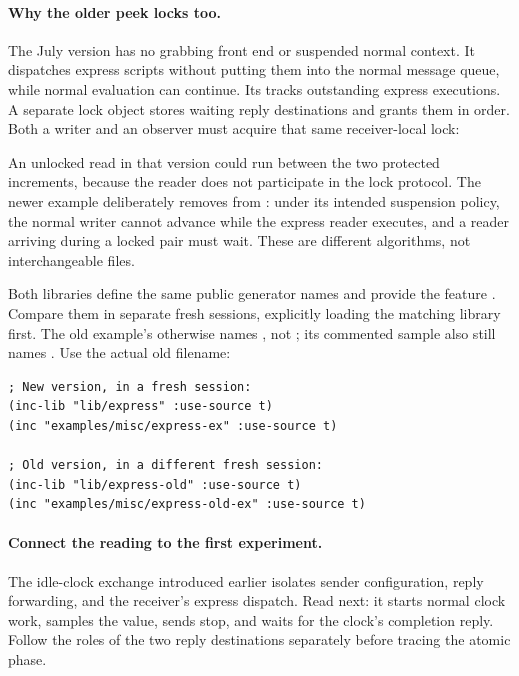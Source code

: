 \paragraph{Why the older peek locks too.}
The July version has no grabbing front end or suspended normal context.
It dispatches express scripts without putting them into the normal
message queue, while normal evaluation can continue. Its
 tracks outstanding express executions. A separate
lock object stores waiting reply destinations and grants them in order.
Both a writer and an observer must acquire that same receiver-local lock:


An unlocked read in that version could run between the two protected
increments, because the reader does not participate in the lock protocol.
The newer example deliberately removes  from :
under its intended suspension policy, the normal writer cannot advance
while the express reader executes, and a reader arriving during a locked
pair must wait. These are different algorithms, not interchangeable files.

Both libraries define the same public generator names and provide the
feature . Compare them in separate fresh sessions, explicitly
loading the matching library first. The old example's 
otherwise names , not ; its commented
sample also still names . Use the actual old filename:

\begin{codeblock}
\begin{lstlisting}
; New version, in a fresh session:
(inc-lib "lib/express" :use-source t)
(inc "examples/misc/express-ex" :use-source t)

; Old version, in a different fresh session:
(inc-lib "lib/express-old" :use-source t)
(inc "examples/misc/express-old-ex" :use-source t)
\end{lstlisting}
\end{codeblock}

\paragraph{Connect the reading to the first experiment.}
The idle-clock exchange introduced earlier isolates sender configuration,
reply forwarding, and the receiver's express dispatch.
Read  next: it starts normal clock work, samples
the value, sends stop, and waits for the clock's completion reply.
Follow the roles of the two reply destinations separately before tracing
the atomic phase.


